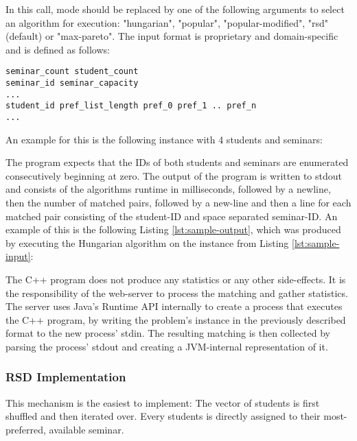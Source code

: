 In this call, mode should be replaced by one of the following arguments to select an algorithm for execution: "hungarian", "popular", "popular-modified", "rsd" (default) or "max-pareto". The input format is proprietary and domain-specific and is defined as follows:
\begin{lstlisting}[frame=single, caption={Program input format},captionpos=b]
seminar_count student_count
seminar_id seminar_capacity
...
student_id pref_list_length pref_0 pref_1 .. pref_n
...
\end{lstlisting}

An example for this is the following instance with 4 students and seminars:


The program expects that the IDs of both students and seminars are enumerated consecutively beginning at zero. The output of the program is written to stdout and consists of the algorithms runtime in milliseconds, followed by a newline, then the number of matched pairs, followed by a new-line and then a line for each matched pair consisting of the student-ID and space separated seminar-ID. An example of this is the following Listing \ref{lst:sample-output}, which was produced by executing the Hungarian algorithm on the instance from Listing \ref{lst:sample-input}:


The C++ program does not produce any statistics or any other side-effects. It is the responsibility of the web-server to process the matching and gather statistics. The server uses Java's Runtime API internally to create a process that executes the C++ program, by writing the problem's instance in the previously described format to the new process' stdin. The resulting matching is then collected by parsing the process' stdout and creating a JVM-internal representation of it. 

\subsubsection{RSD Implementation}
This mechanism is the easiest to implement: The vector of students is first shuffled and then iterated over. Every students is directly assigned to their most-preferred, available seminar.

